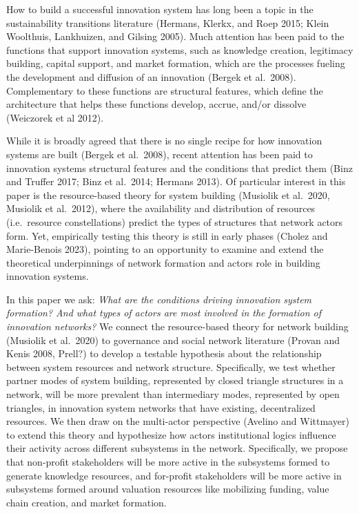 \documentclass[twoside,12pt,final]{ucthesis-CA2012}
\begin{document}
\begin{ucmainmatter}
How to build a successful innovation system has long been a topic in the
sustainability transitions literature (Hermans, Klerkx, and Roep 2015;
Klein Woolthuis, Lankhuizen, and Gilsing
2005). Much attention has
been paid to the functions that support innovation systems, such as
knowledge creation, legitimacy building, capital support, and market
formation, which are the processes fueling the development and diffusion
of an innovation (Bergek et al.~2008). Complementary to these functions
are structural features, which define the architecture that helps these
functions develop, accrue, and/or dissolve (Weiczorek et al 2012).

While it is broadly agreed that there is no single recipe for how
innovation systems are built (Bergek et al.~2008), recent attention has
been paid to innovation systems\textquotesingle{} structural features and the conditions
that predict them (Binz and Truffer 2017; Binz et al.~2014; Hermans
2013). Of particular interest in this paper is the resource-based theory
for system building (Musiolik et al.~2020, Musiolik et al.~2012), where
the availability and distribution of resources (i.e.~resource
constellations) predict the types of structures that network actors
form. Yet, empirically testing this theory is still in early phases
(Cholez and Marie-Benois 2023), pointing to an opportunity to examine
and extend the theoretical underpinnings of network formation and
actors\textquotesingle{} role in building innovation systems.

In this paper we ask: \emph{What are the conditions driving innovation system
formation? And what types of actors are most involved in the formation
of innovation networks?} We connect the resource-based theory for
network building (Musiolik et al.~2020) to governance and social network
literature (Provan and Kenis 2008, Prell?) to develop a testable
hypothesis about the relationship between system resources and network
structure. Specifically, we test whether \textquotesingle partner modes\textquotesingle{} of system
building, represented by closed triangle structures in a network, will
be more prevalent than \textquotesingle intermediary modes\textquotesingle, represented by open
triangles, in innovation system networks that have existing,
decentralized resources. We then draw on the multi-actor perspective
(Avelino and Wittmayer) to extend this theory and hypothesize how
actors\textquotesingle{} institutional logics influence their activity across different
subsystems in the network. Specifically, we propose that non-profit
stakeholders will be more active in the subsystems formed to generate
knowledge resources, and for-profit stakeholders will be more active in
subsystems formed around valuation resources like mobilizing funding,
value chain creation, and market formation.


\end{ucmainmatter}
\end{document}
